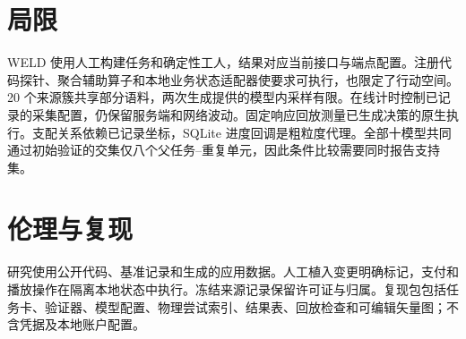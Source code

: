 \documentclass[11pt]{article}
\begin{document}
\section*{局限}
WELD 使用人工构建任务和确定性工人，结果对应当前接口与端点配置。注册代码探针、聚合辅助算子和本地业务状态适配器使要求可执行，也限定了行动空间。20 个来源簇共享部分语料，两次生成提供的模型内采样有限。在线计时控制已记录的采集配置，仍保留服务端和网络波动。固定响应回放测量已生成决策的原生执行。支配关系依赖已记录坐标，SQLite 进度回调是粗粒度代理。全部十模型共同通过初始验证的交集仅八个父任务--重复单元，因此条件比较需要同时报告支持集。

\section*{伦理与复现}
研究使用公开代码、基准记录和生成的应用数据。人工植入变更明确标记，支付和播放操作在隔离本地状态中执行。冻结来源记录保留许可证与归属。复现包包括任务卡、验证器、模型配置、物理尝试索引、结果表、回放检查和可编辑矢量图；不含凭据及本地账户配置。



\clearpage\appendix

\end{document}
